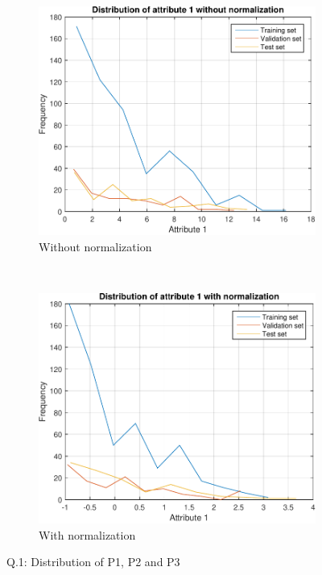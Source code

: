\documentclass[12pt, a4paper]{article}
\begin{document}
\begin{figure}[htbp]
		\centering
		\begin{subfigure}[b]{0.48\textwidth}
		        \includegraphics[width=\textwidth]{Q1}
		        \caption{Without normalization}
		\end{subfigure}
		~
		\begin{subfigure}[b]{0.48\textwidth}
		      \includegraphics[width=\textwidth]{4-1-f}
		      \caption{With normalization}
		\end{subfigure}
\caption{Q.1: Distribution of P1, P2 and P3}
\label{Q1}
\end{figure}
\end{document}
